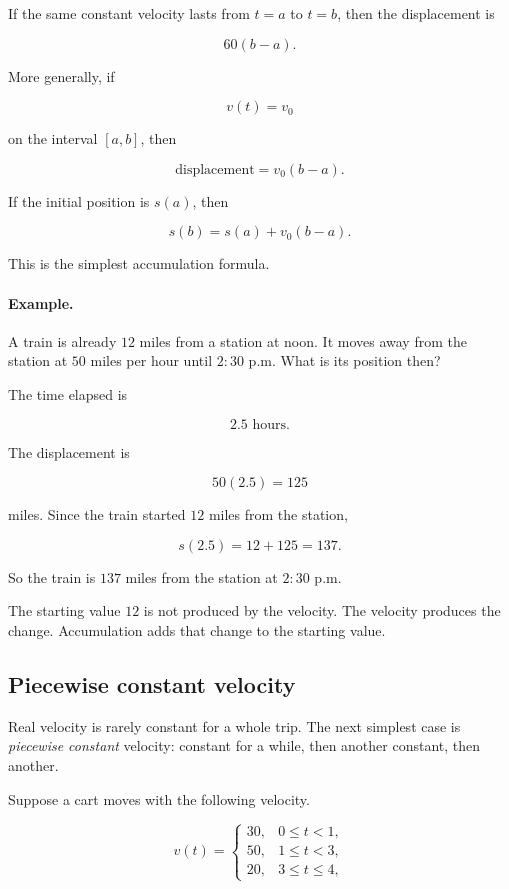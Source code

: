 If the same constant velocity lasts from \(t=a\) to \(t=b\), then the displacement is

\[
60(b-a).
\]

More generally, if

\[
v(t)=v_0
\]

on the interval \([a,b]\), then

\[
\boxed{
\text{displacement}=v_0(b-a).
}
\]

If the initial position is \(s(a)\), then

\[
\boxed{
s(b)=s(a)+v_0(b-a).
}
\]

This is the simplest accumulation formula.

\paragraph{Example.}
A train is already \(12\) miles from a station at noon.  It moves away from the station
at \(50\) miles per hour until \(2{:}30\) p.m.  What is its position then?

The time elapsed is

\[
2.5\text{ hours}.
\]

The displacement is

\[
50(2.5)=125
\]

miles.  Since the train started \(12\) miles from the station,

\[
s(2.5)=12+125=137.
\]

So the train is \(137\) miles from the station at \(2{:}30\) p.m.

The starting value \(12\) is not produced by the velocity.  The velocity produces the
change.  Accumulation adds that change to the starting value.

\subsection{Piecewise constant velocity}
\label{subsec:piecewise-constant-velocity}

Real velocity is rarely constant for a whole trip.  The next simplest case is
\emph{piecewise constant} velocity: constant for a while, then another constant, then
another.

Suppose a cart moves with the following velocity.

\[
v(t)=
\begin{cases}
30, & 0\le t<1,\\
50, & 1\le t<3,\\
20, & 3\le t\le 4,
\end{cases}
\]

